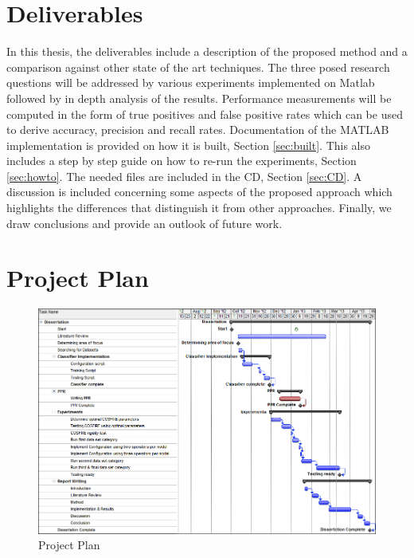 \section {Deliverables}
In this thesis, the deliverables include a description of the proposed method and a comparison against other state of the art techniques. The three posed research questions will be addressed by various experiments implemented on Matlab followed by in depth analysis of the results. Performance measurements will be computed in the form of true positives and false positive rates which can be used to derive accuracy, precision and recall rates. Documentation of the MATLAB implementation is provided on how it is built, Section \ref{sec:built}. This also includes a step by step guide on how to re-run the experiments, Section \ref{sec:howto}. The needed files are included in the CD, Section \ref{sec:CD}. A discussion is included concerning some aspects of the proposed approach which highlights the differences that distinguish it from other approaches. Finally, we draw conclusions and provide an outlook of future work.

\section {Project Plan}

\begin{figure}[H]
    \centering
    \includegraphics[angle=90,totalheight=0.89\textheight, keepaspectratio]{figures/introduction/capture.png}
    \caption[Thesis Project Plan]{Project Plan}
    \label{fig:projectplan}
  \end{figure}
  

